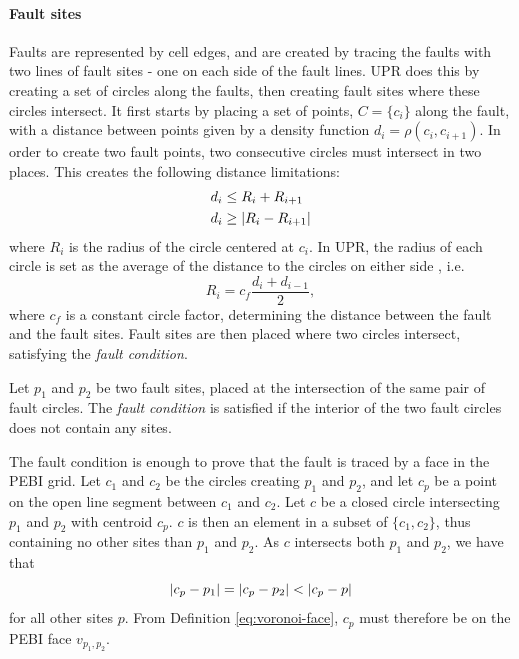 \paragraph{Fault sites}
\label{UPR:faults}
Faults are represented by cell edges, and are created by tracing the faults with two lines of fault sites - one on each side of the fault lines. UPR does this by creating a set of circles along the faults, then creating fault sites where these circles intersect. It first starts by placing a set of points, $C = \{c_i\}$ along the fault, with a distance between points given by a density function $d_i = \rho(c_i, c_{i+1})$. In order to create two fault points, two consecutive circles must intersect in two places. This creates the following distance limitations:
\begin{align}
    d_i &\le R_i + R_{i+1}  \label{eq:fault_distance_le}\\
    d_i &\ge \lvert R_i - R_{i+1}  \label{eq:fault_distance_ge}\rvert
\end{align}
where $R_i$ is the radius of the circle centered at $c_i$. In UPR, the radius of each circle is set as the average of the distance to the circles on either side \cite{UPR_thesis}, i.e.
\begin{equation}
    R_i = c_f \frac{d_i + d_{i-1}}{2},
\end{equation}
where $c_f$ is a constant circle factor, determining the distance between the fault and the fault sites. Fault sites are then placed where two circles intersect, satisfying the \emph{fault condition}.

\begin{definition}
Let $p_1$ and $p_2$ be two fault sites, placed at the intersection of the same pair of fault circles. The \emph{fault condition} is satisfied if the interior of the two fault circles does not contain any sites.
\end{definition}

The fault condition is enough to prove that the fault is traced by a face in the PEBI grid. Let $c_1$ and $c_2$ be the circles creating $p_1$ and $p_2$, and let $c_p$ be a point on the open line segment between $c_1$ and $c_2$. Let $c$ be a closed circle intersecting $p_1$ and $p_2$ with centroid $c_p$. $c$ is then an element in a subset of $\{c_1, c_2\}$, thus containing no other sites than $p_1$ and $p_2$. As $c$ intersects both $p_1$ and $p_2$, we have that
\begin{equation*}
    \lvert c_p - p_1\rvert = \lvert c_p - p_2\rvert < \lvert c_p - p\rvert
\end{equation*}
for all other sites $p$. From Definition \ref{eq:voronoi-face}, $c_p$ must therefore be on the PEBI face $v_{p_1, p_2}$.

